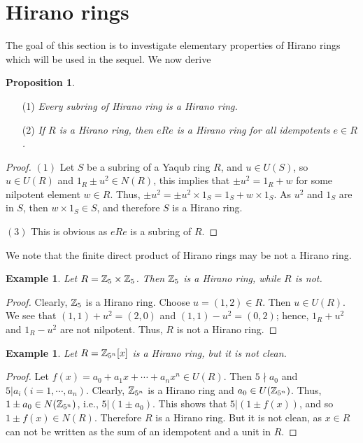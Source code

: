 \documentclass[12pt, reqno]{amsart}
\newtheorem{prop}[thm]{Proposition}
\newtheorem{exam}[thm]{Example}
\numberwithin{equation}{section}
\begin{document}
\section{Hirano rings}

The goal of this section is to investigate elementary properties of Hirano rings which will be used in the sequel. We now derive

\begin{prop}
\end{prop}
\begin{enumerate}
\item [(1)] {\it Every subring of Hirano ring is a Hirano ring.}
\vspace{-.5mm}
\item [(2)] {\it If $R$ is a Hirano ring, then $eRe$ is a Hirano ring for all idempotents $e\in R$.}
\end{enumerate}
\begin{proof} $(1)$ Let $S$ be a subring of a Yaqub ring $R$, and $u\in U(S)$, so $u\in U(R)$ and $1_R\pm u^2\in N(R)$, this implies that $\pm u^2=1_R+w$ for some nilpotent element $w\in R$. Thus, $\pm u^2=\pm u^2\times 1_S=1_S+w\times 1_S$. As $u^2$ and $1_S$ are in $S$, then $w\times 1_S\in S$, and therefore $S$ is a Hirano ring.

$(3)$ This is obvious as $eRe$ is a subring of $R$.\end{proof}

We note that the finite direct product of Hirano rings may be not a Hirano ring.

\begin{exam} Let $R={\Bbb Z}_5\times {\Bbb Z}_5$. Then ${\Bbb Z}_5$ is a Hirano ring, while $R$ is not.\end{exam}
\begin{proof} Clearly, ${\Bbb Z}_5$ is a Hirano ring. Choose $u=(1,2)\in R$. Then $u\in U(R)$. We see that $(1,1)+u^2=(2,0)$ and $(1,1)-u^2=(0,2)$; hence,
$1_R+u^2$ and $1_R-u^2$ are not nilpotent. Thus, $R$ is not a Hirano ring.\end{proof}

\begin{exam} Let $R={\Bbb Z}_{5^n}[x]$ is a Hirano ring, but it is not clean.\end{exam}
\begin{proof} Let $f(x)=a_0+a_1x+\cdots +a_nx^n\in U(R)$. Then $5\nmid a_0$ and $5|a_i (i=1,\cdots,a_n)$.
Clearly, ${\Bbb Z}_{5^n}$ is a Hirano ring and $a_0\in U({\Bbb Z}_{5^n})$. Thus, $1\pm a_0\in N({\Bbb Z}_{5^n})$, i.e., $5|(1\pm a_0)$.
This shows that $5|(1\pm f(x))$, and so $1\pm f(x)\in N(R)$. Therefore $R$ is a Hirano ring. But it is not clean, as $x\in R$ can not be written as the
sum of an idempotent and a unit in $R$.
\end{proof}
\end{document}

